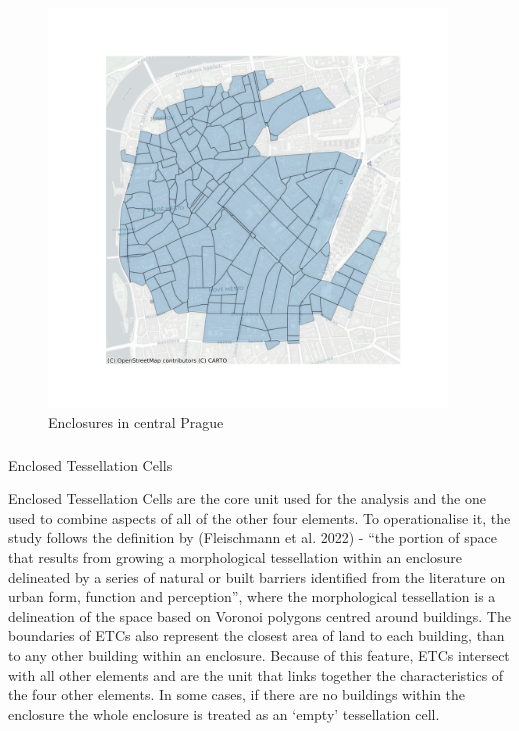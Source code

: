 \documentclass[
  letterpaper,
  DIV=11,
  numbers=noendperiod]{scrartcl}
\makeatletter
\let\oldsubparagraph\subparagraph
\renewcommand{\subparagraph}{
    \@ifstar
      \xxxSubParagraphStar
      \xxxSubParagraphNoStar
  }
\newcommand{\xxxSubParagraphStar}[1]{\oldsubparagraph*{#1}\mbox{}}
\newcommand{\xxxSubParagraphNoStar}[1]{\oldsubparagraph{#1}\mbox{}}
\makeatother
\begin{document}
\begin{figure}[H]

{\centering \includegraphics[width=\linewidth,height=4.16667in,keepaspectratio]{../figures/algo_design/enclosures.png}

}

\caption{Enclosures in central Prague}

\end{figure}%

\subparagraph{Enclosed Tessellation
Cells}\label{enclosed-tessellation-cells}

Enclosed Tessellation Cells are the core unit used for the analysis and
the one used to combine aspects of all of the other four elements. To
operationalise it, the study follows the definition by (Fleischmann et
al. 2022) - ``the portion of space that results from growing a
morphological tessellation within an enclosure delineated by a series of
natural or built barriers identified from the literature on urban form,
function and perception'', where the morphological tessellation is a
delineation of the space based on Voronoi polygons centred around
buildings. The boundaries of ETCs also represent the closest area of
land to each building, than to any other building within an enclosure.
Because of this feature, ETCs intersect with all other elements and are
the unit that links together the characteristics of the four other
elements. In some cases, if there are no buildings within the enclosure
the whole enclosure is treated as an `empty' tessellation cell.
\end{document}
